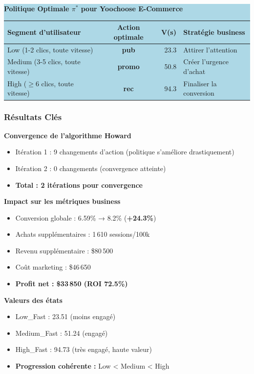 \documentclass[11pt,a4paper]{article}
\begin{document}
\begin{center}
\colorbox{LightBlue}{\parbox{0.9\textwidth}{
\textbf{Politique Optimale $\pi^*$ pour Yoochoose E-Commerce}
 
\medskip
\begin{tabular}{l|cc|l}
\textbf{Segment d'utilisateur} & \textbf{Action optimale} & \textbf{V(s)} & \textbf{Stratégie business} \\
\midrule
\rowcolor{LightBlue}
Low (1-2 clics, toute vitesse) & \textbf{pub} & ~23.3 & Attirer l'attention \\
\rowcolor{LightOrange}
Medium (3-5 clics, toute vitesse) & \textbf{promo} & ~50.8 & Créer l'urgence d'achat \\
\rowcolor{LightRed}
High ($\geq 6$ clics, toute vitesse) & \textbf{rec} & ~94.3 & Finaliser la conversion \\
\end{tabular}
\medskip
}}
\end{center}
 
\subsubsection{Résultats Clés}
 
\begin{resultBox}
\textbf{Convergence de l'algorithme Howard}
\begin{itemize}[leftmargin=1.5cm,itemsep=2pt]
  \item Itération 1 : 9 changements d'action (politique s'améliore drastiquement)
  \item Itération 2 : 0 changements (convergence atteinte)
  \item \textbf{Total : 2 itérations pour convergence}
\end{itemize}
 
\medskip
\textbf{Impact sur les métriques business}
\begin{itemize}[leftmargin=1.5cm,itemsep=2pt]
  \item Conversion globale : 6.59\% → 8.2\% (\textbf{+24.3\%})
  \item Achats supplémentaires : 1\,610 sessions/100k
  \item Revenu supplémentaire : \$80\,500
  \item Coût marketing : \$46\,650
  \item \textbf{Profit net : \$33\,850 (ROI 72.5\%)}
\end{itemize}
 
\medskip
\textbf{Valeurs des états}
\begin{itemize}[leftmargin=1.5cm,itemsep=2pt]
  \item Low\_Fast : 23.51 (moins engagé)
  \item Medium\_Fast : 51.24 (engagé)
  \item High\_Fast : 94.73 (très engagé, haute valeur)
  \item \textbf{Progression cohérente :} Low < Medium < High
\end{itemize}
\end{resultBox}
 
\end{document}
